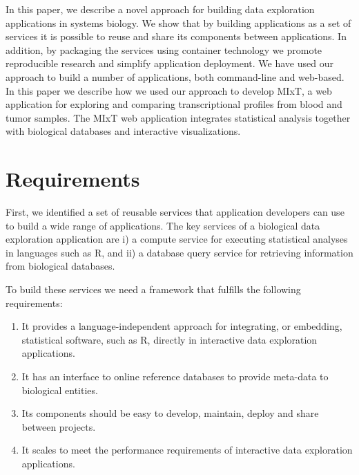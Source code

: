 In this paper, we describe a novel approach for building data exploration
applications in systems biology. We show that by building applications as a set
of services it is possible to reuse and share its components between
applications. In addition, by packaging the services using container technology
we promote reproducible research and simplify application deployment. We have
used our approach to build a number of applications, both command-line and
web-based. In this paper we describe how we used our approach to develop MIxT,
a web application for exploring and comparing transcriptional profiles from
blood and tumor samples. The MIxT web application integrates statistical
analysis together with biological databases and interactive visualizations.


\section*{Requirements} 
First, we identified a set of reusable services that application developers can
use to build a wide range of applications. The key services of a biological data
exploration application are i) a compute service for executing statistical
analyses in languages such as R, and ii) a database query service for retrieving
information from biological databases.

To build these services we need a framework that fulfills the following
requirements: 

\begin{enumerate}
    \item It provides a language-independent approach for integrating, or
        embedding, statistical software, such as R, directly in interactive data
        exploration applications.
    \item It has an interface to online reference databases to provide meta-data to
        biological entities. %
    \item Its components should be easy to develop, maintain, deploy and share
        between projects. 
    \item It scales to meet the performance requirements of interactive data
        exploration applications. 
\end{enumerate} 
